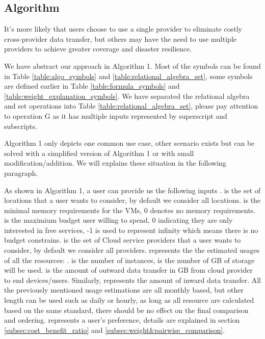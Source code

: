 \documentclass[journal]{IEEEtran}
\begin{document}
\subsection{ Algorithm}
\label{subsec:algorithm}
It's more likely that users choose to use a single provider to eliminate costly cross-provider data transfer, but others may have the need to use multiple providers to achieve greater coverage and disaster resilience.

We have abstract our approach in Algorithm 1. Most of the symbols can be found in Table \ref{table:algo_symbols} and \ref{table:relational_algebra_set}, some symbols are defined earlier in Table \ref{table:formula_symbols} and \ref{table:weight_explanation_symbols}. We have separated the relational algebra and set operations into Table \ref{table:relational_algebra_set}, please pay attention to operation G as it has multiple inputs represented by superscript and subscripts. 

Algorithm 1 only depicts one common use case, other scenario exists but can be solved with a simplified version of Algorithm 1 or with small modification/addition. We will explains these situation in the following paragraph.

As shown in Algorithm 1, a user can provide us the following inputs .  is the set of locations that a user wants to consider, by default we consider all locations.  is the minimal memory requirements for the VMs, 0 denotes no memory requirements.  is the maximium budget user willing to spend, 0 indicating they are only interested in free services, -1 is used to represent infinity which means there is no budget constrains.  is the set of Cloud service providers that a user wants to consider, by default we consider all providers.  represents the the estimated usages of all the resources: .  is the number of instances,  is the number of GB of storage will be used.  is the amount of outward data transfer in GB from cloud provider to end devices/users. Similarly,  represents the amount of inward data transfer. All the previously mentioned usage estimations are all monthly based, but other length can be used such as daily or hourly, as long as all resource are calculated based on the same standard, there should be no effect on the final comparison and ordering.  represents a user's preference, details are explained in section \ref{subsec:cost_benefit_ratio} and \ref{subsec:weight&pairwise_comparison}.
\end{document}
